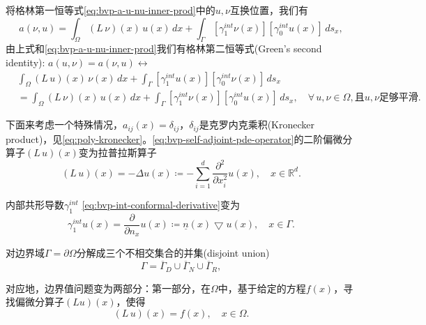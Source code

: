将格林第一恒等式\eqref{eq:bvp-a-u-nu-inner-prod}中的$u,\nu$互换位置，我们有
\begin{equation*}
  a\left(\nu,u \right) = \int_{\Omega} \left( L \, \nu \right)(x) \, u(x) \, dx + \int_{\Gamma} \left[ \gamma_1^{int} \nu(x) \right] \left[ \gamma_0^{int} u(x) \right] \, d s_x,
\end{equation*}
由上式和\eqref{eq:bvp-a-u-nu-inner-prod}我们有格林第二恒等式(Green's second identity): $a(u,\nu) = a(\nu,u) \leftrightarrow$
\begin{equation}
  \label{eq:bvp-a-nu-u-green-2nd-identity}
  \begin{split}
    &\int_{\Omega} \left( L \, u \right)(x) \, \nu(x) \, dx + \int_{\Gamma} \left[ \gamma_1^{int} u(x) \right] \left[ \gamma_0^{int} \nu(x) \right] \, d s_x \\
    &= \int_{\Omega} \left( L \, \nu \right)(x) \, u(x) \, dx + \int_{\Gamma} \left[ \gamma_1^{int} \nu(x) \right] \left[ \gamma_0^{int} u(x) \right] \, d s_x, \quad \forall \, u,\nu \in \Omega, \text{且}u,\nu\text{足够平滑}.
  \end{split}
\end{equation}

下面来考虑一个特殊情况，$a_{ij}(x)=\delta_{ij}$，$\delta_{ij}$是克罗内克乘积(Kronecker product)，见\eqref{eq:poly-kronecker}。\eqref{eq:bvp-self-adjoint-pde-operator}的二阶偏微分算子$\left(L\,u\right)(x)$变为拉普拉斯算子
\begin{equation}
  \label{eq:bvp-laplace-operator}
  \left( L \, u \right)(x) = - \Delta u(x) \coloneqq - \sum_{i=1}^{d} \frac{\partial^2}{\partial x_i^2} u(x), \quad x \in \mathbb{R}^d.
\end{equation}

内部共形导数$\gamma_1^{int}$ \eqref{eq:bvp-int-conformal-derivative}变为
\begin{equation}
  \label{eq:bvp-laplace-conformal-derivative}
  \gamma_1^{int}u(x) = \frac{\partial}{\partial n_x} u(x) \coloneqq \underline{n}(x) \bigtriangledown u(x), \quad x \in \Gamma.
\end{equation}

对边界域$\Gamma = \partial \Omega$分解成三个不相交集合的并集(disjoint union)
\begin{equation*}
  \Gamma = \overline{\Gamma}_D \cup \overline{\Gamma}_N \cup \overline{\Gamma}_R,
\end{equation*}

对应地，边界值问题变为两部分：第一部分，在$\Omega$中，基于给定的方程$f(x)$，寻找偏微分算子$(L u)(x)$，使得
\begin{equation}
  \label{eq:bvp-extension-omega-cond}
  \left( L \, u \right)(x) = f(x), \quad x \in \Omega.
\end{equation}

